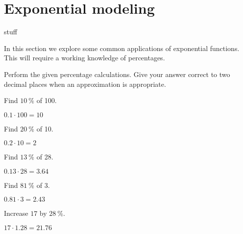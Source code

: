 \section{Exponential modeling}\label{exp:sec:populationmodels}
\begin{outcomes}
	\begin{outcomelist}
		\item stuff
	\end{outcomelist}
\end{outcomes}
In this section we explore some common applications of exponential functions. This will 
require a working knowledge of percentages.
\begin{essentialskills}
	\begin{problem}
	Perform the given percentage calculations. Give your answer correct 
	to two decimal places when an approximation is appropriate.
	\begin{multicols}{2}
		\begin{subproblem}
			Find $\SI{10}{\percent}$ of 100. 
			\begin{shortsolution}
				$0.1\cdot 100 = 10$ 
			\end{shortsolution}
		\end{subproblem}
		\begin{subproblem}
			Find $\SI{20}{\percent}$ of 10. 
			\begin{shortsolution}
				$0.2\cdot 10=2$ 
			\end{shortsolution}
		\end{subproblem}
		\begin{subproblem}
			Find $\SI{13}{\percent}$ of 28. 
			\begin{shortsolution}
				$0.13\cdot 28=3.64$ 
			\end{shortsolution}
		\end{subproblem}
		\begin{subproblem}
			Find $\SI{81}{\percent}$ of 3. 
			\begin{shortsolution}
				$0.81\cdot 3=2.43$ 
			\end{shortsolution}
		\end{subproblem}
		\begin{subproblem}
			Increase $17$ by $\SI{28}{\percent}$. 
			\begin{shortsolution}
				$17\cdot 1.28=21.76$ 
			\end{shortsolution}
		\end{subproblem}

\end{multicols}
\end{problem}
\end{essentialskills}
